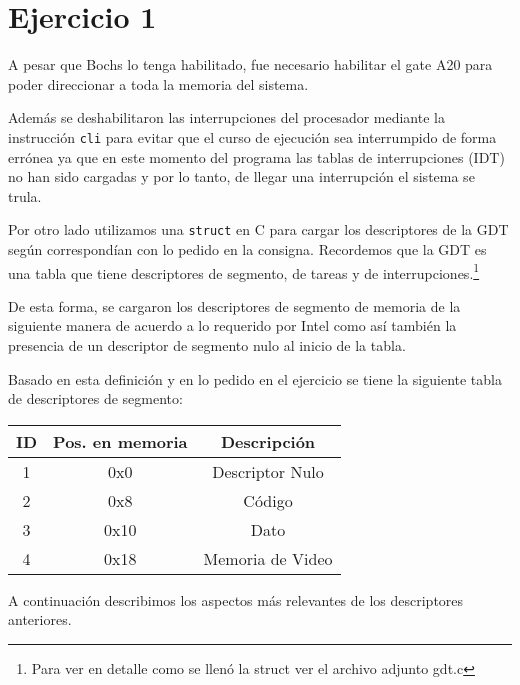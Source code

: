 \section{Ejercicio 1}

A pesar que Bochs lo tenga habilitado, fue necesario habilitar el gate A20 para poder direccionar a toda la memoria del sistema.


Además se deshabilitaron las interrupciones del procesador mediante la instrucción \texttt{cli} para evitar que el curso de ejecución sea interrumpido de forma errónea ya que en este momento del programa las tablas de interrupciones (IDT) no han sido cargadas y por lo tanto, de llegar una interrupción el sistema se trula. %

Por otro lado utilizamos una \texttt{struct} en C para cargar los descriptores de la GDT según correspondían con lo pedido en la consigna. Recordemos que la GDT es una tabla que tiene descriptores de segmento, de tareas y de interrupciones.\footnote{Para ver en detalle como se llenó la struct ver el archivo adjunto gdt.c}

De esta forma, se cargaron los descriptores de segmento de memoria de la siguiente manera de acuerdo a lo requerido por Intel como así también la presencia de un descriptor de segmento nulo al inicio de la tabla.


Basado en esta definición y en lo pedido en el ejercicio se tiene la siguiente tabla de descriptores de segmento:

\begin{center}
\begin{tabular}{|c|c|c|}
\hline
ID & Pos. en memoria & Descripción\\
\hline
1 & 0x0 & Descriptor Nulo \\
2 & 0x8 & Código \\
3 & 0x10 & Dato \\
4 & 0x18 & Memoria de Video \\
\hline
\end{tabular}
\end{center}

A continuación describimos los aspectos más relevantes de los descriptores anteriores.

